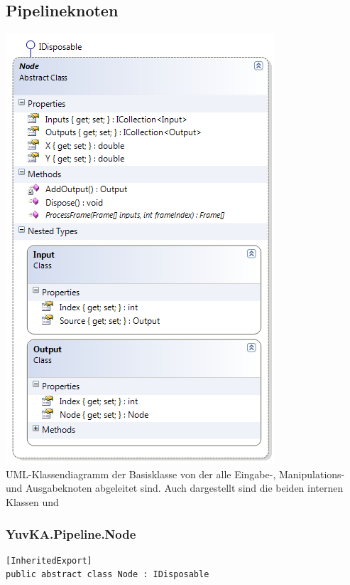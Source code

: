 \subsection{Pipelineknoten}
\begin{center}\includegraphics[scale=0.7]{YuvKA.Pipeline/node.png} \\
UML-Klassendiagramm der Basisklasse  von der alle Eingabe-, Manipulations- und Ausgabeknoten abgeleitet sind. Auch dargestellt sind die beiden internen Klassen  und 
\end{center}

\subsubsection{YuvKA.Pipeline.Node}

\begin{verbatim}
[InheritedExport]
public abstract class Node : IDisposable
\end{verbatim}

